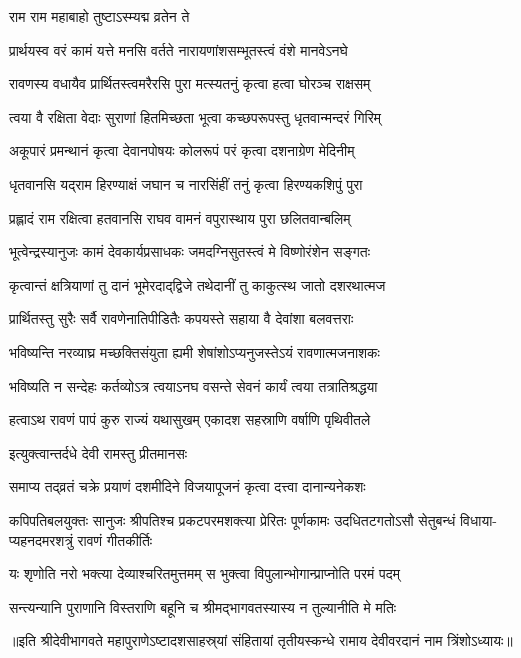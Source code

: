 \onelineshloka
{राम राम महाबाहो तुष्टाऽस्म्यद्म व्रतेन ते}%

\twolineshloka
{प्रार्थयस्व वरं कामं यत्ते मनसि वर्तते}
{नारायणांशसम्भूतस्त्वं वंशे मानवेऽनघे}%

\twolineshloka
{रावणस्य वधायैव प्रार्थितस्त्वमरैरसि}
{पुरा मत्स्यतनुं कृत्वा हत्वा घोरञ्च राक्षसम्}%

\twolineshloka
{त्वया वै रक्षिता वेदाः सुराणां हितमिच्छता}
{भूत्वा कच्छपरूपस्तु धृतवान्मन्दरं गिरिम्}%

\twolineshloka
{अकूपारं प्रमन्थानं कृत्वा देवानपोषयः}
{कोलरूपं परं कृत्वा दशनाग्रेण मेदिनीम्}%

\twolineshloka
{धृतवानसि यद्‌राम हिरण्याक्षं जघान च}
{नारसिंहीं तनुं कृत्वा हिरण्यकशिपुं पुरा}%

\twolineshloka
{प्रह्लादं राम रक्षित्वा हतवानसि राघव}
{वामनं वपुरास्थाय पुरा छलितवान्बलिम्}%

\twolineshloka
{भूत्वेन्द्रस्यानुजः कामं देवकार्यप्रसाधकः}
{जमदग्निसुतस्त्वं मे विष्णोरंशेन सङ्गतः}%

\twolineshloka
{कृत्वान्तं क्षत्रियाणां तु दानं भूमेरदाद्‌द्विजे}
{तथेदानीं तु काकुत्स्थ जातो दशरथात्मज}%

\twolineshloka
{प्रार्थितस्तु सुरैः सर्वै रावणेनातिपीडितैः}
{कपयस्ते सहाया वै देवांशा बलवत्तराः}%

\twolineshloka
{भविष्यन्ति नरव्याघ्र मच्छक्तिसंयुता ह्यमी}
{शेषांशोऽप्यनुजस्तेऽयं रावणात्मजनाशकः}%

\twolineshloka
{भविष्यति न सन्देहः कर्तव्योऽत्र त्वयाऽनघ}
{वसन्ते सेवनं कार्यं त्वया तत्रातिश्रद्धया}%

\twolineshloka
{हत्वाऽथ रावणं पापं कुरु राज्यं यथासुखम्}
{एकादश सहस्राणि वर्षाणि पृथिवीतले}%



\onelineshloka
{इत्युक्त्वान्तर्दधे देवी रामस्तु प्रीतमानसः}%

\twolineshloka
{समाप्य तद्‌व्रतं चक्रे प्रयाणं दशमीदिने}
{विजयापूजनं कृत्वा दत्त्वा दानान्यनेकशः}%

\fourlineindentedshloka
{कपिपतिबलयुक्तः सानुजः श्रीपतिश्च}
{प्रकटपरमशक्त्या प्रेरितः पूर्णकामः}
{उदधितटगतोऽसौ सेतुबन्धं विधाया-}
{प्यहनदमरशत्रुं रावणं गीतकीर्तिः}%

\twolineshloka
{यः शृणोति नरो भक्त्या देव्याश्चरितमुत्तमम्}
{स भुक्त्वा विपुलान्भोगान्प्राप्नोति परमं पदम्}%

\twolineshloka
{सन्त्यन्यानि पुराणानि विस्तराणि बहूनि च}
{श्रीमद्‌भागवतस्यास्य न तुल्यानीति मे मतिः}%

॥इति श्रीदेवीभागवते महापुराणेऽष्टादशसाहस्र्यां संहितायां तृतीयस्कन्धे रामाय देवीवरदानं नाम त्रिंशोऽध्यायः॥

\closesection